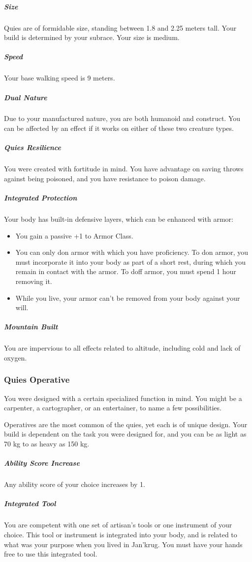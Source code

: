 \subparagraph{Size} Quies are of formidable size, standing between 1.8 and 2.25 meters tall.
Your build is determined by your subrace.
Your size is medium.

\subparagraph{Speed} Your base walking speed is 9 meters.

\subparagraph{Dual Nature} Due to your manufactured nature, you are both humanoid and construct.
You can be affected by an effect if it works on either of these two creature types.

\subparagraph{Quies Resilience} You were created with fortitude in mind.
You have advantage on saving throws against being poisoned, and you have resistance to poison damage.

\subparagraph{Integrated Protection} Your body has built-in defensive layers, which can be enhanced with armor:

\begin{itemize}
    \item You gain a passive +1 to Armor Class.
    \item You can only don armor with which you have proficiency.
    To don armor, you must incorporate it into your body as part of a short rest, during which you remain in contact with the armor.
    To doff armor, you must spend 1 hour removing it.
    \item While you live, your armor can't be removed from your body against your will.
\end{itemize}


\subparagraph{Mountain Built} You are impervious to all effects related to altitude, including cold and lack of oxygen.

\subsubsection{Quies Operative}
You were designed with a certain specialized function in mind.
You might be a carpenter, a cartographer, or an entertainer, to name a few possibilities.

Operatives are the most common of the quies, yet each is of unique design.
Your build is dependent on the task you were designed for, and you can be as light as 70 kg to as heavy as 150 kg.

\subparagraph{Ability Score Increase} Any ability score of your choice increases by 1.

\subparagraph{Integrated Tool} You are competent with one set of artisan's tools or one instrument of your choice.
This tool or instrument is integrated into your body, and is related to what was your purpose when you lived in Jan'krug.
You must have your hands free to use this integrated tool.

